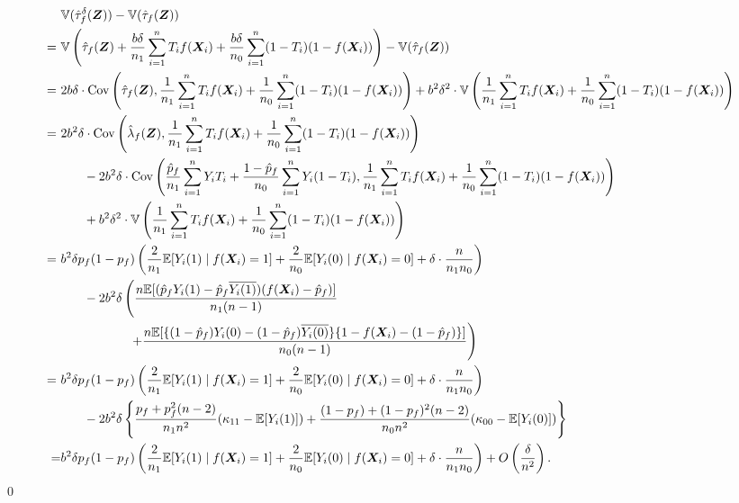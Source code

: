 \documentclass[USenglish,onecolumn]{article}
\DeclareMathOperator\Cov{Cov}
\newcommand\E{\mathbb{E}}
\newcommand\V{\mathbb{V}}
\newcommand\bX{\bm{X}}
\newcommand\bZ{\bm{Z}}
\begin{document}
\begin{align*}
  &\V(\hat\tau^\delta_f(\bZ))-\V(\hat\tau_f(\bZ))
  \\= \ &\V\left(\hat\tau_f(\bZ) + \frac{b\delta}{n_1} \sum_{i=1}^n T_if(\bX_i)+ \frac{b\delta}{n_0} \sum_{i=1}^n (1-T_i)(1-f(\bX_i))\right) - \V(\hat\tau_f(\bZ))
  \\= \ &2b\delta \cdot \Cov\left(\hat\tau_f(\bZ) , \frac{1}{n_1}
          \sum_{i=1}^n T_if(\bX_i)+ \frac{1}{n_0} \sum_{i=1}^n
          (1-T_i)(1-f(\bX_i))\right) + b^2\delta^2 \cdot \V\left(\frac{1}{n_1} \sum_{i=1}^n T_if(\bX_i)+\frac{1}{n_0} \sum_{i=1}^n (1-T_i)(1-f(\bX_i))\right)
  \\= \ &2b^2\delta \cdot \Cov\left(\hat\lambda_f(\bZ) , \frac{1}{n_1}
       \sum_{i=1}^n T_if(\bX_i)+ \frac{1}{n_0} \sum_{i=1}^n
       (1-T_i)(1-f(\bX_i))\right) \\
  & \hspace{.25in} - 2 b^2\delta \cdot
    \Cov\left(\frac{\hat{p}_f}{n_1} \sum_{i=1}^n Y_iT_i+ \frac{1-\hat{p}_f}{n_0}  \sum_{i=1}^n Y_i(1-T_i) ,
    \frac{1}{n_1} \sum_{i=1}^n  T_if(\bX_i)+ \frac{1}{n_0}
    \sum_{i=1}^n (1-T_i)(1-f(\bX_i))\right)\\
  & \hspace{.25in} + b^2\delta^2\cdot \V\left(\frac{1}{n_1} \sum_{i=1}^n T_if(\bX_i)+\frac{1}{n_0} \sum_{i=1}^n (1-T_i)(1-f(\bX_i))\right)
  \\= \ & b^2 \delta p_f(1-p_f)\left(\frac{2}{n_1}\E[Y_i(1) \mid
          f(\bX_i)=1]+ \frac{2}{n_0}\E[Y_i(0) \mid f(\bX_i)=0]+ \delta
          \cdot \frac{n}{n_1n_0}\right)\\
  & \hspace{.25in} -  2b^2\delta \left(\frac{n\E[(\hat{p}_f Y_i(1) - \hat{p}_f
    \overline{Y_i(1)})(f(\bX_i)-\hat{p}_f)]}{n_1(n-1)} \right. \\
  & \hspace{.75in} \left. + \frac{n\E[\{(1-\hat{p}_f) Y_i(0) - (1-\hat{p}_f) \overline{Y_i(0)}\}\{1-f(\bX_i)-(1-\hat{p}_f)\}]}{n_0(n-1)}\right)
  \\= \ & b^2 \delta p_f(1-p_f)\left(\frac{2}{n_1}\E[Y_i(1) \mid
          f(\bX_i)=1]+ \frac{2}{n_0}\E[Y_i(0) \mid f(\bX_i)=0]+ \delta
          \cdot \frac{n}{n_1n_0}\right)\\ & \hspace{.25in} - 2 b^2\delta \left\{\frac{p_f+p_f^2(n-2)}{n_1n^2}(\kappa_{11}-\E[Y_i(1)])+ \frac{(1-p_f)+(1-p_f)^2(n-2)}{n_0n^2}(\kappa_{00}-\E[Y_i(0)])\right\}
  \\= & b^2 \delta p_f(1-p_f)\left(\frac{2}{n_1}\E[Y_i(1) \mid
        f(\bX_i)=1]+ \frac{2}{n_0}\E[Y_i(0) \mid f(\bX_i)=0]+ \delta
        \cdot \frac{n}{n_1n_0}\right)+O\left(\frac{\delta}{n^2}\right).
\end{align*}
\qed
\end{document}
